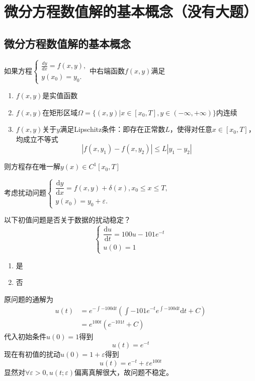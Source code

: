 \section{微分方程数值解的基本概念（没有大题）}
\subsection{微分方程数值解的基本概念}
\begin{theorem}
    如果方程$\begin{cases}\frac{dy}{dx}=f(x,y),\\y(x_0)=y_0.\end{cases}$中右端函数$f(x,y)$满足
    \begin{enumerate}
        \item $f(x,y)$是实值函数
        \item $f(x,y)$在矩形区域$\Omega=\{(x,y)|x\in[x_{0},T],y\in(-\infty,+\infty)\}$内连续
        \item $f(x,y)$关于$y$满足Lipschitz条件：即存在正常数$L$，使得对任意$x\in\left[ x_0,T \right]$，均成立不等式
        \[
            |f(x,y_1)-f(x,y_2)|\leq L|y_1-y_2|
        \]
    \end{enumerate}
    则方程存在唯一解$y(x)\in C^{1}[x_0,T]$
\end{theorem}
\begin{definition}[扰动问题]
    考虑扰动问题$\begin{cases}\dfrac{\mathrm{d}y}{\mathrm{d}x}=f(x,y)+\delta(x),x_0\leq x\leq T,\\y(x_0)=y_0+\varepsilon.\end{cases}$
\end{definition}
\begin{example}
    以下初值问题是否关于数据的扰动稳定？
    \[
        \begin{cases}
            \dfrac{\mathrm{d}u}{\mathrm{d}t}=100u-101e^{-t}\\
            u(0)=1
        \end{cases}
    \]
    \begin{enumerate}
        \item [\choice{}{A}] 是
        \item [\choice{1}{B}] 否 
    \end{enumerate}
    \begin{solution}
        原问题的通解为
        \[
            \begin{aligned}
                u(t) &= e^{-\int-100\mathrm{d}t}\left( \int -101e^{-t}e^{\int-100\mathrm{d}t}\mathrm{d}t + C \right)\\
                &=e^{100t}\left( e^{-101t} + C \right)
            \end{aligned}
        \]
        代入初始条件$u(0) = 1$得到
        \[
            u(t) = e^{-t}
        \]
        现在有初值的扰动$u(0) = 1+\varepsilon$得到
        \[
            u(t) = e^{-t} + \varepsilon e^{100t}
        \]
        显然对$\forall \varepsilon>0,u(t;\varepsilon)$偏离真解很大，故问题不稳定。
    \end{solution}
\end{example}
